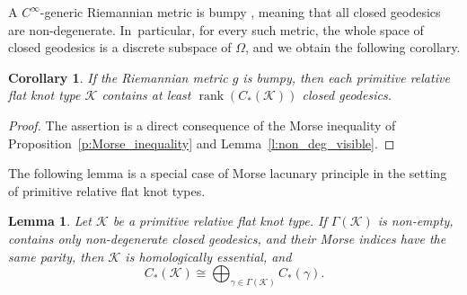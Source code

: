 \documentclass[JEP,XML,SOM,Unicode,NoFloatCountersInSection,published]{cedram}
\newcommand{\KK}{\mathcal{K}}
\DeclareMathOperator{\rank}{rank}
\theoremstyle{plain}
\newtheorem{Lemma}[Thm]{Lemma}
\newtheorem{Cor}[Thm]{Corollary}
\theoremstyle{definition}
\begin{document}
A $C^\infty$-generic Riemannian metric is bumpy \cite{Anosov:1982aa}, meaning that all closed geodesics are non-degenerate. In~particular, for every such metric, the whole space of closed geodesics is a discrete subspace of $\Omega$, and we obtain the following corollary.

\begin{Cor}
If the Riemannian metric $g$ is bumpy, then each primitive relative flat knot type $\KK$ contains at least $\rank(C_*(\KK))$ closed geodesics.
\end{Cor}

\begin{proof}
The assertion is a direct consequence of the Morse inequality of Proposition~\ref{p:Morse_inequality} and Lemma~\ref{l:non_deg_visible}.
\end{proof}

The following lemma is a special case of Morse lacunary principle in the setting of primitive relative flat knot types.

\begin{Lemma}
\label{l:local_homology_parity}
Let $\KK$ be a primitive relative flat knot type. If $\Gamma(\KK)$ is non-empty, contains only non-degenerate closed geodesics, and their Morse indices have the same parity, then $\KK$ is homologically essential, and
\[
C_*(\KK) \cong \bigoplus_{\gamma\in\Gamma(\KK)} C_*(\gamma).
\]
\end{Lemma}
\end{document}
